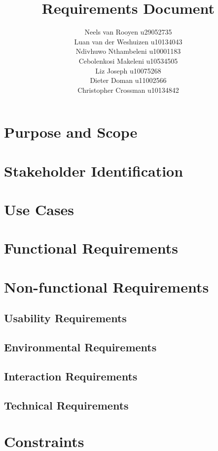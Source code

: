 \documentclass[12pt,a4paper]{article}
\begin{document}
\title{Requirements Document}
\author{Neels van Rooyen u29052735\\
Luan van der Weshuizen u10134043\\
Ndivhuwo Nthambeleni u10001183\\
Cebolenkosi Makeleni u10534505\\
Liz Joseph u10075268\\
Dieter Doman u11002566\\
Christopher Crossman u10134842}
\maketitle
\pagebreak
\section{Purpose and Scope}
\pagebreak
\section{Stakeholder Identification}
\pagebreak
\section{Use Cases}
\pagebreak
\section{Functional Requirements}
\pagebreak
\section{Non-functional Requirements}
\subsection{Usability Requirements}
\subsection{Environmental Requirements}
\subsection{Interaction Requirements}
\subsection{Technical Requirements}
\pagebreak
\section{Constraints}
\end{document}
